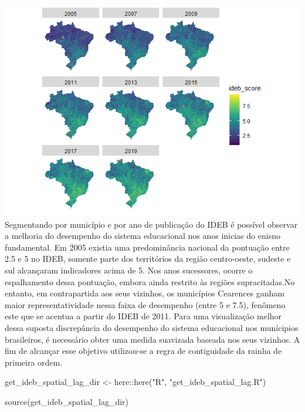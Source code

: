 \documentclass[
]{article}
\newenvironment{Shaded}{\begin{snugshade}}{\end{snugshade}}
\newcommand{\FunctionTok}[1]{\textcolor[rgb]{0.00,0.00,0.00}{#1}}
\newcommand{\NormalTok}[1]{#1}
\newcommand{\OtherTok}[1]{\textcolor[rgb]{0.56,0.35,0.01}{#1}}
\newcommand{\SpecialCharTok}[1]{\textcolor[rgb]{0.00,0.00,0.00}{#1}}
\newcommand{\StringTok}[1]{\textcolor[rgb]{0.31,0.60,0.02}{#1}}
\begin{document}
\includegraphics{report_files/figure-gfm/unnamed-chunk-4-1.png}
Segmentando por município e por ano de publicação do IDEB é possível
observar a melhoria do desempenho do sistema educacional nos anos
inicias do enisno fundamental. Em 2005 existia uma predominância
nacional da pontuação entre 2.5 e 5 no IDEB, somente parte dos
territórios da região centro-oeste, sudeste e sul alcançaram indicadores
acima de 5. Nos anos sucessores, ocorre o espalhamento dessa pontuação,
embora ainda restrito às regiões supracitadas.No entanto, em
contrapartida aos seus vizinhos, os municípios Cearences ganham maior
representatividade nessa faixa de desempenho (entre 5 e 7.5), fenômeno
este que se acentua a partir do IDEB de 2011. Para uma visualização
melhor dessa suposta discrepância do desempenho do sistema educacional
nos munícipios brasileiros, é necessário obter uma medida suavizada
baseada nos seus vizinhos. A fim de alcançar esse objetivo utilizou-se a
regra de contiguidade da rainha de primeira ordem.

\begin{Shaded}
\begin{Highlighting}[]
\NormalTok{get\_ideb\_spatial\_lag\_dir }\OtherTok{\textless{}{-}}\NormalTok{ here}\SpecialCharTok{::}\FunctionTok{here}\NormalTok{(}\StringTok{"R"}\NormalTok{, }\StringTok{"get\_ideb\_spatial\_lag.R"}\NormalTok{)}

\FunctionTok{source}\NormalTok{(get\_ideb\_spatial\_lag\_dir)}
\end{Highlighting}
\end{Shaded}
\end{document}
